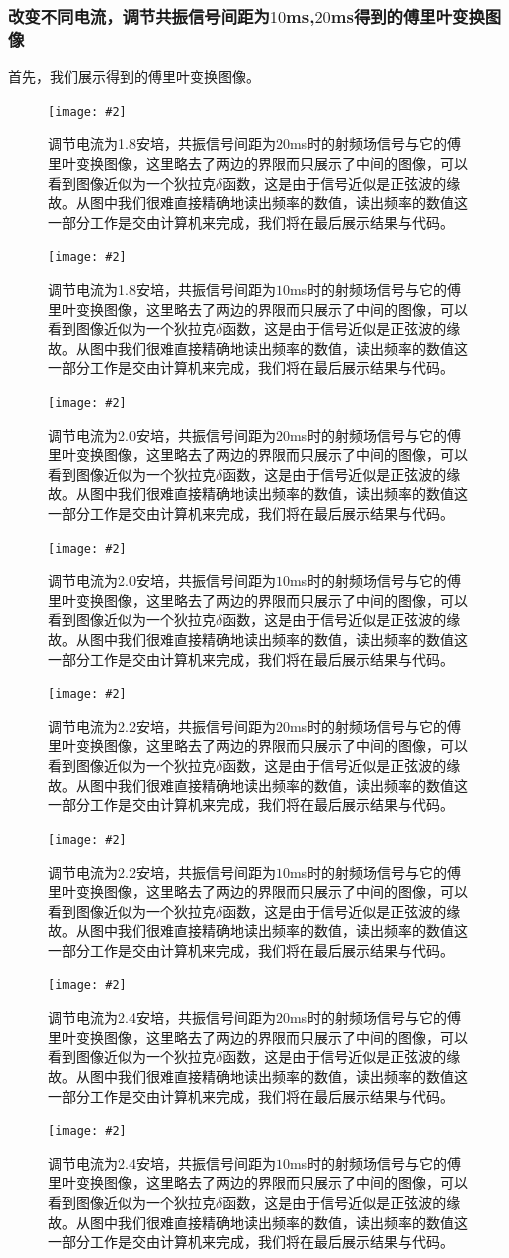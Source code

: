 \documentclass{ctexart}
\newcommand{\cpic}[2]{
\begin{center}
\texttt{[image: \#2]}
\end{center}
}
\newcommand{\cpicn}[3]
{
\begin{figure}[H]
\cpic{#1}{#2}
\caption{#3\label{#2}}
\end{figure}
}
\begin{document}
\subsubsection{改变不同电流，调节共振信号间距为$10$ms,$20$ms得到的傅里叶变换图像}
首先，我们展示得到的傅里叶变换图像。
\cpicn{0.5}{18_1}{调节电流为1.8安培，共振信号间距为$20$ms时的射频场信号与它的傅里叶变换图像，这里略去了两边的界限而只展示了中间的图像，可以看到图像近似为一个狄拉克$\delta$函数，这是由于信号近似是正弦波的缘故。从图中我们很难直接精确地读出频率的数值，读出频率的数值这一部分工作是交由计算机来完成，我们将在最后展示结果与代码。}
\cpicn{0.5}{18_2}{调节电流为1.8安培，共振信号间距为$10$ms时的射频场信号与它的傅里叶变换图像，这里略去了两边的界限而只展示了中间的图像，可以看到图像近似为一个狄拉克$\delta$函数，这是由于信号近似是正弦波的缘故。从图中我们很难直接精确地读出频率的数值，读出频率的数值这一部分工作是交由计算机来完成，我们将在最后展示结果与代码。}
\cpicn{0.5}{20_1}{调节电流为2.0安培，共振信号间距为$20$ms时的射频场信号与它的傅里叶变换图像，这里略去了两边的界限而只展示了中间的图像，可以看到图像近似为一个狄拉克$\delta$函数，这是由于信号近似是正弦波的缘故。从图中我们很难直接精确地读出频率的数值，读出频率的数值这一部分工作是交由计算机来完成，我们将在最后展示结果与代码。}
\cpicn{0.5}{20_2}{调节电流为2.0安培，共振信号间距为$10$ms时的射频场信号与它的傅里叶变换图像，这里略去了两边的界限而只展示了中间的图像，可以看到图像近似为一个狄拉克$\delta$函数，这是由于信号近似是正弦波的缘故。从图中我们很难直接精确地读出频率的数值，读出频率的数值这一部分工作是交由计算机来完成，我们将在最后展示结果与代码。}
\cpicn{0.5}{22_1}{调节电流为2.2安培，共振信号间距为$20$ms时的射频场信号与它的傅里叶变换图像，这里略去了两边的界限而只展示了中间的图像，可以看到图像近似为一个狄拉克$\delta$函数，这是由于信号近似是正弦波的缘故。从图中我们很难直接精确地读出频率的数值，读出频率的数值这一部分工作是交由计算机来完成，我们将在最后展示结果与代码。}
\cpicn{0.5}{22_2}{调节电流为2.2安培，共振信号间距为$10$ms时的射频场信号与它的傅里叶变换图像，这里略去了两边的界限而只展示了中间的图像，可以看到图像近似为一个狄拉克$\delta$函数，这是由于信号近似是正弦波的缘故。从图中我们很难直接精确地读出频率的数值，读出频率的数值这一部分工作是交由计算机来完成，我们将在最后展示结果与代码。}
\cpicn{0.5}{24_1}{调节电流为2.4安培，共振信号间距为$20$ms时的射频场信号与它的傅里叶变换图像，这里略去了两边的界限而只展示了中间的图像，可以看到图像近似为一个狄拉克$\delta$函数，这是由于信号近似是正弦波的缘故。从图中我们很难直接精确地读出频率的数值，读出频率的数值这一部分工作是交由计算机来完成，我们将在最后展示结果与代码。}
\cpicn{0.5}{24_2}{调节电流为2.4安培，共振信号间距为$10$ms时的射频场信号与它的傅里叶变换图像，这里略去了两边的界限而只展示了中间的图像，可以看到图像近似为一个狄拉克$\delta$函数，这是由于信号近似是正弦波的缘故。从图中我们很难直接精确地读出频率的数值，读出频率的数值这一部分工作是交由计算机来完成，我们将在最后展示结果与代码。}
\end{document}
